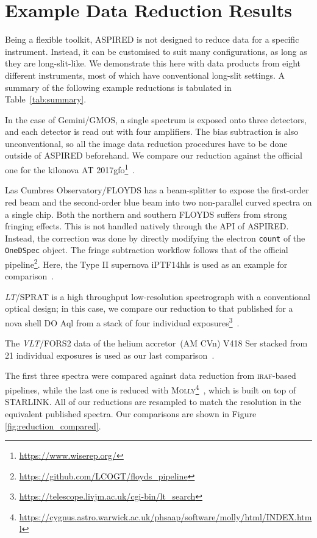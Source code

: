 \documentclass[linenumbers, twocolumn]{aastex631}
\begin{document}
\section{Example Data Reduction Results}
\label{sec:examples}
Being a flexible toolkit, \textsc{ASPIRED} is not designed to reduce data for a
specific instrument. Instead, it can be customised to suit many configurations,
as long as they are long-slit-like. We demonstrate this here with data products
from eight different instruments, most of which have conventional long-slit
settings. A summary of the following example reductions is tabulated in
Table~\ref{tab:summary}.

In the case of Gemini/GMOS, a single spectrum is exposed onto
three detectors, and each detector is read out with four amplifiers. The bias 
subtraction is also unconventional, so all the image data reduction procedures
have to be done outside of \textsc{ASPIRED} beforehand. We compare our reduction against
the official one for the kilonova AT 2017gfo\footnote{\url{https://www.wiserep.org/}}~\citep{2017ApJ...848L..32M}. 

Las Cumbres Observatory/FLOYDS has a beam-splitter to expose the first-order
red beam and the second-order blue beam into two non-parallel
curved spectra on a single chip. Both the northern and southern FLOYDS suffers
from strong fringing effects. This is not handled natively through the API of 
\textsc{ASPIRED}. Instead, the correction was done by directly modifying the
electron \texttt{count} of the \texttt{OneDSpec} object. The fringe subtraction
workflow follows that of the official
pipeline\footnote{\url{https://github.com/LCOGT/floyds_pipeline}}. Here, the
Type II supernova iPTF14hls is used as an example for
comparison~\citep{2017Natur.551..210A}.

\textit{LT}/SPRAT is a high throughput low-resolution spectrograph with
a conventional optical design; in this case, we compare our reduction to that published for a nova 
shell DO Aql from a stack of four individual 
exposures\footnote{\url{https://telescope.livjm.ac.uk/cgi-bin/lt_search}}~\citep{2020MNRAS.499.2959H}. 

The \textit{VLT}/FORS2 data
of the helium accretor~(AM CVn) V418 Ser stacked from 21 individual exposures is
used as our last comparison~\citep{2020MNRAS.496.1243G}. 

The first three spectra were 
compared against data reduction from \textsc{iraf}-based pipelines, while the
last one is reduced with \textsc{Molly}\footnote{
\url{https://cygnus.astro.warwick.ac.uk/phsaap/software/molly/html/INDEX.html}}~\citep{2019ascl.soft07012M},
which is built on top of \textsc{STARLINK}. All of our reductions are resampled to match
the resolution in the equivalent published spectra. Our comparisons are shown in Figure \ref{fig:reduction_compared}.
\end{document}
